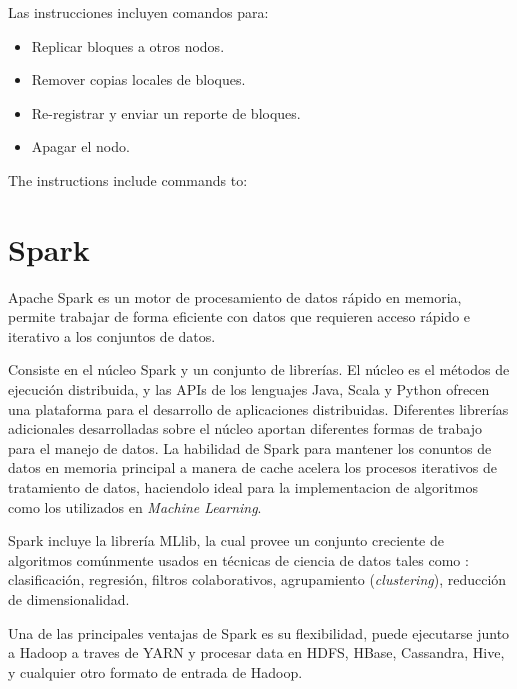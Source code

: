 Las instrucciones incluyen comandos para: 

\begin{itemize}
    \item Replicar bloques a otros nodos.
    \item Remover copias locales de bloques.
    \item Re-registrar y enviar un reporte de bloques.
    \item Apagar el nodo.
 \end{itemize} The instructions include commands to:



\section{Spark}
Apache Spark es un motor de procesamiento de datos rápido en memoria, permite trabajar de forma eficiente con datos que requieren acceso rápido e iterativo a los conjuntos de datos.\cite{spark}

Consiste en el núcleo Spark y un conjunto de librerías. El núcleo es el métodos de ejecución distribuida, y las APIs de los lenguajes Java, Scala y Python ofrecen una plataforma para el desarrollo de aplicaciones distribuidas. Diferentes librerías adicionales desarrolladas sobre el núcleo aportan diferentes formas de trabajo para el manejo de datos. La habilidad de Spark para mantener los conuntos de datos en memoria principal a manera de cache acelera los procesos iterativos de tratamiento de datos, haciendolo ideal para la implementacion de algoritmos como los utilizados en \textit{Machine Learning}.\cite{spark}


Spark incluye la librería MLlib, la cual provee un conjunto creciente de algoritmos comúnmente usados en técnicas de ciencia de datos tales como : clasificación, regresión, filtros colaborativos, agrupamiento (\textit{clustering}), reducción de dimensionalidad.\cite{spark}

Una de las principales ventajas de Spark es su flexibilidad, puede ejecutarse junto a Hadoop a traves de  YARN y procesar data en HDFS, HBase, Cassandra, Hive, y cualquier otro formato de entrada de Hadoop.\cite{spark}
